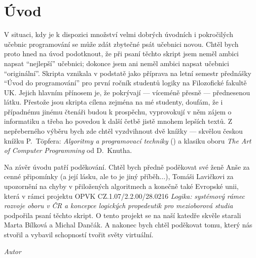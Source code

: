 \chapter*{Úvod}
V situaci, kdy je k dispozici množství velmi dobrých úvodních i pokročilých
učebnic programování se může zdát zbytečné psát učebnici novou. Chtěl bych
proto hned na úvod podotknout, že při psaní těchto skript jsem neměl ambici
napsat ``nejlepší'' učebnici; dokonce jsem ani neměl ambici napsat učebnici
``originální''. Skripta vznikala v podstatě jako příprava na letní semestr
přednášky ``Úvod do programování'' pro první ročník studentů logiky na 
Filozofické fakultě UK. Jejich hlavním přínosem je, že pokrývají --- víceméně 
přesně --- přednesenou látku. Přestože jsou skripta cílena zejména na 
mé studenty, doufám, že i případnému jinému čtenáři budou k prospěchu,
vyprovokují v něm zájem o informatiku a třeba ho povedou k další četbě jistě
mnohem lepších textů. Z nepřeberného výběru bych zde chtěl vyzdvihnout dvě
knížky --- skvělou českou knížku P.~T\"opfera: \emph{Algoritmy a programovací techniky}
(\cite{Topfer:1995}) a klasiku oboru \emph{The Art of Computer Programming} od
D.~Knutha.

Na závěr úvodu patří poděkování. Chtěl bych předně poděkovat své ženě Anše
za cenné připomínky (a její lásku, ale to je jiný příběh$\ldots$), Tomáši
Lavičkovi za upozornění na chyby v přiložených algoritmech a konečně také
Evropské unii, která v rámci projektu OPVK CZ.1.07/2.2.00/28.0216 
\emph{Logika: systémový rámec rozvoje oboru v ČR a koncepce logických 
propedeutik pro mezioborová studia} podpořila psaní těchto skript. O tento
projekt se na naší katedře skvěle starali Marta Bílková a Michal Dančák. 
A nakonec bych chtěl poděkovat tomu, který nás stvořil a vybavil schopností 
tvořit světy virtuální.

\hfill \emph{Autor}



\ifx\ucebnice\undefined

\fi